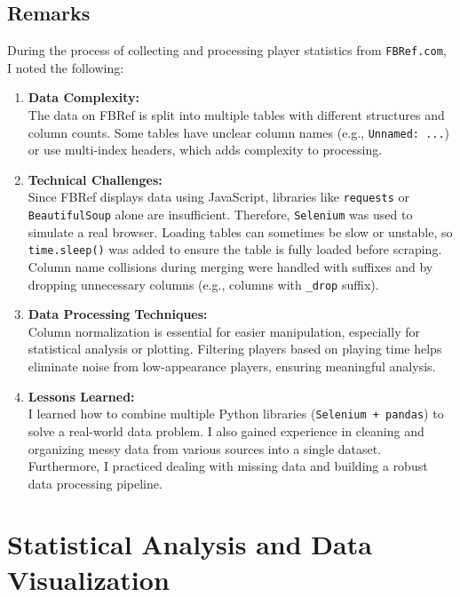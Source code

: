 \documentclass[12pt,a4paper]{article}
\begin{document}
\subsection{Remarks}
During the process of collecting and processing player statistics from \texttt{FBRef.com}, I noted the following:

\begin{enumerate}
    \item \textbf{Data Complexity:} \\
    The data on FBRef is split into multiple tables with different structures and column counts. Some tables have unclear column names (e.g., \texttt{Unnamed: ...}) or use multi-index headers, which adds complexity to processing.

    \item \textbf{Technical Challenges:} \\
    Since FBRef displays data using JavaScript, libraries like \texttt{requests} or \texttt{BeautifulSoup} alone are insufficient. Therefore, \texttt{Selenium} was used to simulate a real browser. Loading tables can sometimes be slow or unstable, so \texttt{time.sleep()} was added to ensure the table is fully loaded before scraping. Column name collisions during merging were handled with suffixes and by dropping unnecessary columns (e.g., columns with \texttt{\_drop} suffix).

    \item \textbf{Data Processing Techniques:} \\
    Column normalization is essential for easier manipulation, especially for statistical analysis or plotting. Filtering players based on playing time helps eliminate noise from low-appearance players, ensuring meaningful analysis.

    \item \textbf{Lessons Learned:} \\
    I learned how to combine multiple Python libraries (\texttt{Selenium + pandas}) to solve a real-world data problem. I also gained experience in cleaning and organizing messy data from various sources into a single dataset. Furthermore, I practiced dealing with missing data and building a robust data processing pipeline.
\end{enumerate}



\section{Statistical Analysis and Data Visualization}
\end{document}

